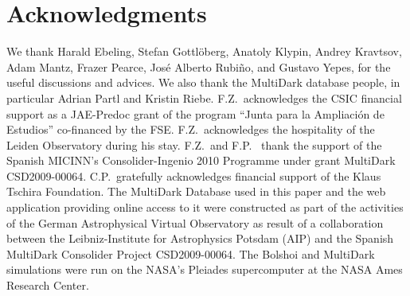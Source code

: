 \documentclass[useAMS,usenatbib]{mn2e}
\begin{document}
\section*{Acknowledgments}
We thank Harald Ebeling, Stefan Gottl{\"o}berg, Anatoly Klypin, Andrey Kravtsov, Adam Mantz, 
Frazer Pearce, Jos\'e Alberto Rubi\~no, and Gustavo Yepes, for the useful discussions and advices. 
We also thank the MultiDark database people, in particular Adrian Partl and Kristin Riebe. 
F.Z.{\ }acknowledges the CSIC financial support as a JAE-Predoc grant of the 
program ``Junta para la Ampliaci\'on de Estudios'' co-financed by the FSE. 
F.Z.{\ }acknowledges the hospitality of the Leiden Observatory during his stay.
F.Z.{\ }and F.P.{\ } thank the support of the Spanish MICINN's Consolider-Ingenio 2010 Programme under
grant MultiDark CSD2009-00064. C.P.{\ }gratefully acknowledges financial support
of the Klaus Tschira Foundation. The MultiDark Database used in this paper and
the web application providing online access to it were constructed as part of
the activities of the German Astrophysical Virtual Observatory as result of a
collaboration between the Leibniz-Institute for Astrophysics Potsdam (AIP) and
the Spanish MultiDark Consolider Project CSD2009-00064. The Bolshoi and
MultiDark simulations were run on the NASA's Pleiades supercomputer at the NASA
Ames Research Center.






\label{lastpage}
\end{document}
